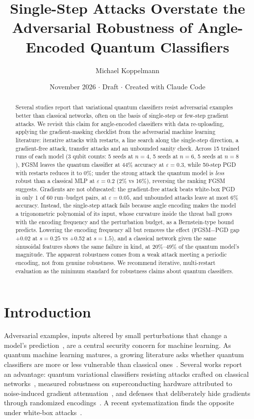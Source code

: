 \documentclass[11pt]{article}
\title{Single-Step Attacks Overstate the Adversarial Robustness of Angle-Encoded Quantum Classifiers}
\author{Michael Koppelmann}
\date{November 2026 $\cdot$ Draft $\cdot$ Created with Claude Code}
\begin{document}
\maketitle
\begin{abstract}
Several studies report that variational quantum classifiers resist adversarial examples better than classical networks, often on the basis of single-step or few-step gradient attacks. We revisit this claim for angle-encoded classifiers with data re-uploading, applying the gradient-masking checklist from the adversarial machine learning literature: iterative attacks with restarts, a line search along the single-step direction, a gradient-free attack, transfer attacks and an unbounded sanity check. Across 15 trained runs of each model (3 qubit counts: 5 seeds at $n=4$, 5 seeds at $n=6$, 5 seeds at $n=8$), FGSM leaves the quantum classifier at 44\% accuracy at $\varepsilon=0.3$, while 50-step PGD with restarts reduces it to 0\%; under the strong attack the quantum model is \emph{less} robust than a classical MLP at $\varepsilon=0.2$ (2\% vs 16\%), reversing the ranking FGSM suggests. Gradients are not obfuscated: the gradient-free attack beats white-box PGD in only 1 of 60 run--budget pairs, at $\varepsilon=0.05$, and unbounded attacks leave at most 6\% accuracy. Instead, the single-step attack fails because angle encoding makes the model a trigonometric polynomial of its input, whose curvature inside the threat ball grows with the encoding frequency and the perturbation budget, as a Bernstein-type bound predicts. Lowering the encoding frequency all but removes the effect (FGSM$-$PGD gap +0.02 at $s=0.25$ vs +0.52 at $s=1.5$), and a classical network given the same sinusoidal features shows the same failure in kind, at 20\%--49\% of the quantum model's magnitude. The apparent robustness comes from a weak attack meeting a periodic encoding, not from genuine robustness. We recommend iterative, multi-restart evaluation as the minimum standard for robustness claims about quantum classifiers.
\end{abstract}

\section{Introduction}\label{sec:intro}
Adversarial examples, inputs altered by small perturbations that change a model's prediction~\cite{goodfellow2015,madry2018}, are a central security concern for machine learning. As quantum machine learning matures, a growing literature asks whether quantum classifiers are more or less vulnerable than classical ones~\cite{liu2020,lu2020}. Several works report an advantage: quantum variational classifiers resisting attacks crafted on classical networks~\cite{west2022}, measured robustness on superconducting hardware attributed to noise-induced gradient attenuation~\cite{hwbench2025}, and defenses that deliberately hide gradients through randomized encodings~\cite{gong2022}. A recent systematization finds the opposite under white-box attacks~\cite{sok2025}.
\end{document}
